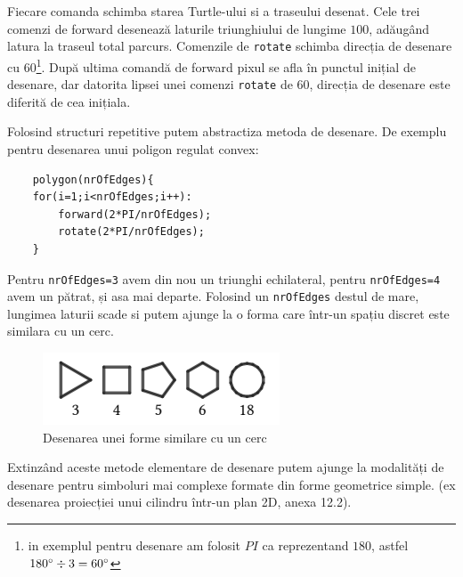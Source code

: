 Fiecare comanda schimba starea Turtle-ului si a traseului desenat. 
Cele trei comenzi de forward desenează laturile triunghiului de lungime \(100\), adăugând latura la traseul total parcurs. 
Comenzile de \verb|rotate| schimba direcția de desenare cu \(60\)\degree \footnote{in exemplul pentru desenare am folosit \(PI\) ca reprezentand \(180\)\degree, astfel \(180\degree \div 3 = 60\degree\)}. 
După ultima comandă de forward pixul se afla în punctul inițial de desenare, dar datorita lipsei unei comenzi \verb|rotate| de \(60\)\degree, 
direcția de desenare este diferită de cea inițiala.\newline

Folosind structuri repetitive putem abstractiza metoda de desenare. De exemplu pentru desenarea unui poligon regulat convex\cite{turtle}:

\begin{lstlisting}
    polygon(nrOfEdges){
    for(i=1;i<nrOfEdges;i++):
        forward(2*PI/nrOfEdges);
        rotate(2*PI/nrOfEdges);	
    }
\end{lstlisting}

Pentru \verb|nrOfEdges=3| avem din nou un triunghi echilateral, pentru \verb|nrOfEdges=4| avem un pătrat, și asa mai departe. 
Folosind un \verb|nrOfEdges| destul de mare, lungimea laturii scade si putem ajunge la o forma care într-un spațiu discret 
este similara cu un cerc.\newline 

\begin{figure}[H]
    \begin{center}
        \includegraphics[scale=1]{imagini/turtle/circle.png}
        \caption{Desenarea unei forme similare cu un cerc \protect\footnotemark}
        \label{fig:tabs}
    \end{center}    
\end{figure}


Extinzând aceste metode elementare de desenare putem ajunge la modalități de desenare pentru simboluri mai complexe 
formate din forme geometrice simple. (ex desenarea proiecției unui cilindru într-un plan 2D, anexa 12.2). \newline

